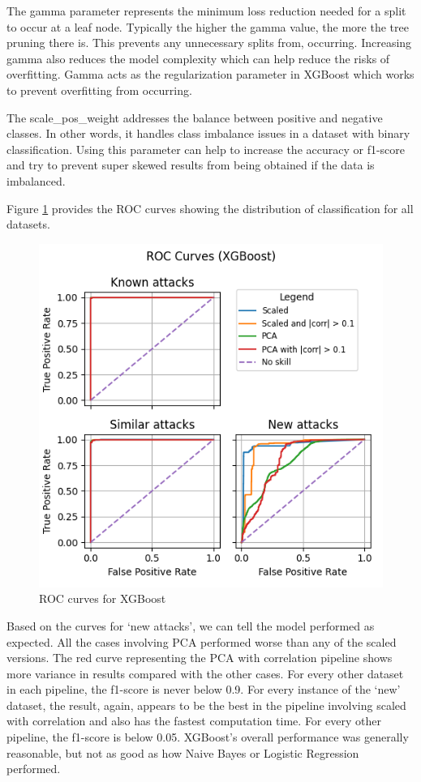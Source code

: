 \documentclass[journal]{IEEEtran}
\begin{document}
The gamma parameter represents the minimum loss reduction needed for a split to occur at a leaf node. Typically the higher the gamma value, the more the tree pruning there is. This prevents any unnecessary splits from, occurring. Increasing gamma also reduces the model complexity which can help reduce the risks of overfitting. Gamma acts as the regularization parameter in XGBoost which works to prevent overfitting from occurring. 

The scale\_pos\_weight addresses the balance between positive and negative classes. In other words, it handles class imbalance issues in a dataset with binary classification. Using this parameter can help to increase the accuracy or f1-score and try to prevent super skewed results from being obtained if the data is imbalanced. 

Figure \ref{fig:xgboost_roc} provides the ROC curves showing the distribution of classification for all datasets.

\begin{figure}
    \centering
    \includegraphics[width=\linewidth]{figures/XGBoost_roc_all_small.png}
    \caption{ROC curves for XGBoost}
    \label{fig:xgboost_roc}
\end{figure}

Based on the curves for `new attacks', we can tell the model performed as expected. All the cases involving PCA performed worse than any of the scaled versions. The red curve representing the PCA with correlation pipeline shows more variance in results compared with the other cases. For every other dataset in each pipeline, the f1-score is never below 0.9. For every instance of the `new' dataset, the result, again, appears to be the best in the pipeline involving scaled with correlation and also has the fastest computation time. For every other pipeline, the f1-score is below 0.05. XGBoost's overall performance was generally reasonable, but not as good as how Naive Bayes or Logistic Regression performed. 
\end{document}
